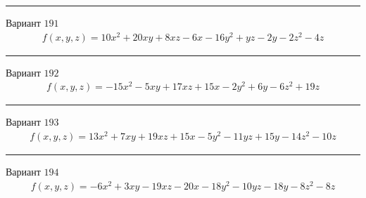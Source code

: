 \documentclass[11pt]{report}
\begin{document}
\begin{center}
\noindent\rule{8cm}{0.4pt}
\end{center}
Вариант $191$
\begin{align*}
    f(x, y, z) = 10 x^{2} + 20 x y + 8 x z - 6 x - 16 y^{2} + y z - 2 y - 2 z^{2} - 4 z
\end{align*}
\begin{center}
\noindent\rule{8cm}{0.4pt}
\end{center}
Вариант $192$
\begin{align*}
    f(x, y, z) = - 15 x^{2} - 5 x y + 17 x z + 15 x - 2 y^{2} + 6 y - 6 z^{2} + 19 z
\end{align*}
\begin{center}
\noindent\rule{8cm}{0.4pt}
\end{center}
Вариант $193$
\begin{align*}
    f(x, y, z) = 13 x^{2} + 7 x y + 19 x z + 15 x - 5 y^{2} - 11 y z + 15 y - 14 z^{2} - 10 z
\end{align*}
\begin{center}
\noindent\rule{8cm}{0.4pt}
\end{center}
Вариант $194$
\begin{align*}
    f(x, y, z) = - 6 x^{2} + 3 x y - 19 x z - 20 x - 18 y^{2} - 10 y z - 18 y - 8 z^{2} - 8 z
\end{align*}
\end{document}
